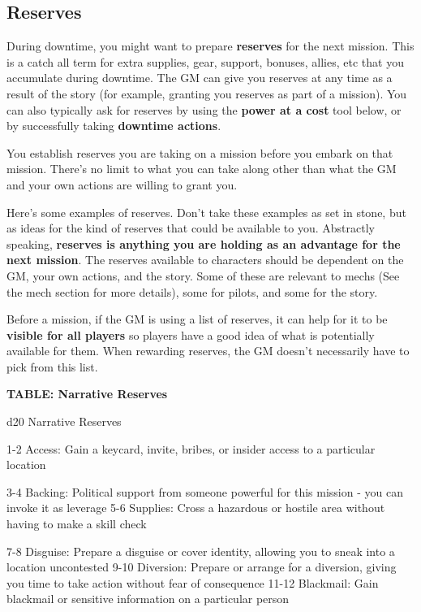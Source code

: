 \subsection{Reserves}

During downtime, you might want to prepare \textbf{reserves} for the next mission. This is a catch all term for extra supplies, gear, support, bonuses, allies, etc that you accumulate during downtime. The GM can give you reserves at any time as a result of the story (for example, granting you reserves as part of a mission). You can also typically ask for reserves by using the\textbf{ power at a cost} tool below, or by successfully taking \textbf{downtime actions}.

You establish reserves you are taking on a mission before you embark on that mission. There's no limit to what you can take along other than what the GM and your own actions are willing to grant you.

Here's some examples of reserves. Don't take these examples as set in stone, but as ideas for the kind of reserves that could be available to you. Abstractly speaking, \textbf{reserves is anything you are holding as an advantage for the next mission}. The reserves available to characters should be dependent on the GM, your own actions, and the story. Some of these are relevant to mechs (See the mech section for more details), some for pilots, and some for the story.

Before a mission, if the GM is using a list of reserves, it can help for it to be \textbf{visible for all players} so players have a good idea of what is potentially available for them. When rewarding reserves, the GM doesn't necessarily have to pick from this list.

\textbf{TABLE: Narrative Reserves}

 d20       Narrative	Reserves

  1-2      Access: Gain a keycard, invite, bribes, or insider access to a particular location

  3-4      Backing: Political support from someone powerful for this mission - you can invoke it
           as leverage
  5-6      Supplies: Cross a hazardous or hostile area without having to make a skill check

  7-8      Disguise: Prepare a disguise or cover identity, allowing you to sneak into a location
           uncontested
 9-10      Diversion: Prepare or arrange for a diversion, giving you time to take action without
           fear of consequence
   11-12   Blackmail: Gain blackmail or sensitive information on a particular person

